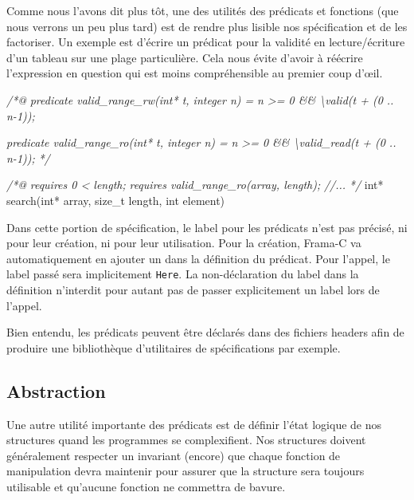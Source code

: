 \documentclass[12pt,francais,]{scrbook}
\newenvironment{Shaded}{}{}
\newcommand{\DataTypeTok}[1]{\textcolor[rgb]{0.56,0.13,0.00}{{#1}}}
\newcommand{\CommentTok}[1]{\textcolor[rgb]{0.38,0.63,0.69}{\textit{{#1}}}}
\newcommand{\NormalTok}[1]{{#1}}
\begin{document}
Comme nous l'avons dit plus tôt, une des utilités des prédicats et
fonctions (que nous verrons un peu plus tard) est de rendre plus lisible
nos spécification et de les factoriser. Un exemple est d'écrire un
prédicat pour la validité en lecture/écriture d'un tableau sur une plage
particulière. Cela nous évite d'avoir à réécrire l'expression en
question qui est moins compréhensible au premier coup d'œil.

\begin{footnotesize}\begin{Shaded}
\begin{Highlighting}[]
\CommentTok{/*@}
\CommentTok{  predicate valid_range_rw(int* t, integer n) =}
\CommentTok{    n >= 0 && \textbackslash{}valid(t + (0 .. n-1));}

\CommentTok{  predicate valid_range_ro(int* t, integer n) =}
\CommentTok{    n >= 0 && \textbackslash{}valid_read(t + (0 .. n-1));}
\CommentTok{*/}

\CommentTok{/*@}
\CommentTok{  requires 0 < length;}
\CommentTok{  requires valid_range_ro(array, length);}
\CommentTok{  //...}
\CommentTok{*/}
\DataTypeTok{int}\NormalTok{* search(}\DataTypeTok{int}\NormalTok{* array, size_t length, }\DataTypeTok{int} \NormalTok{element)}
\end{Highlighting}
\end{Shaded}\end{footnotesize}

Dans cette portion de spécification, le label pour les prédicats n'est
pas précisé, ni pour leur création, ni pour leur utilisation. Pour la
création, Frama-C va automatiquement en ajouter un dans la définition du
prédicat. Pour l'appel, le label passé sera implicitement \texttt{Here}.
La non-déclaration du label dans la définition n'interdit pour autant
pas de passer explicitement un label lors de l'appel.

Bien entendu, les prédicats peuvent être déclarés dans des fichiers
headers afin de produire une bibliothèque d'utilitaires de
spécifications par exemple.

\subsection{Abstraction}\label{abstraction}

Une autre utilité importante des prédicats est de définir l'état logique
de nos structures quand les programmes se complexifient. Nos structures
doivent généralement respecter un invariant (encore) que chaque fonction
de manipulation devra maintenir pour assurer que la structure sera
toujours utilisable et qu'aucune fonction ne commettra de bavure.
\end{document}
